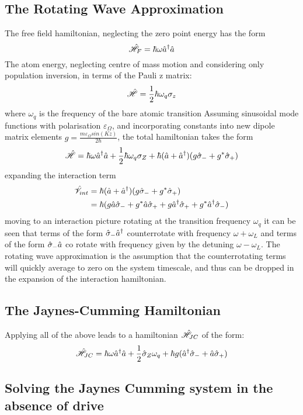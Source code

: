 \subsection{The Rotating Wave Approximation}
The free field hamiltonian, neglecting the zero point energy has the form
\begin{equation}
	\hat{\mathscr{H}}_F =  \hbar \omega {\hat{a}^\dagger} \hat{a}
\end{equation}
The atom energy, neglecting centre of mass motion and considering only population inversion, in terms of the Pauli z matrix:
\begin{equation}
	\hat{\mathscr{H}} = \frac {1} {2} \hbar \omega_q \sigma_z
\end{equation}
where $\omega_q$ is the frequency of the bare atomic transition
Assuming sinusoidal mode functions with polarisation $\varepsilon_\Omega$, and incorporating constants into new dipole matrix elements $g = \frac{m \varepsilon_\Omega sin(Kz)} {2 \hbar}$, the total hamiltonian takes the form
\begin{equation}
	\hat{\mathscr{H}} = \hbar \omega {\hat{a}^\dagger} \hat{a} +\frac{1}{2} \hbar \omega_q \sigma_Z + \hbar (\hat{a} +{\hat{a}^\dagger})(g\hat{\sigma}_-+g^*\hat{\sigma}_+)
\end{equation}
expanding the interaction term
\begin{align}
  \hat{\mathscr{V}}_{int} &= \hbar (\hat{a} +{\hat{a}^\dagger})(g\hat{\sigma}_-+g^*\hat{\sigma}_+) \\
                          &=  \hbar (g \hat{a} \hat{\sigma}_- + g^* \hat{a} \hat{\sigma}_+ + g {\hat{a}^\dagger} \hat{\sigma}_+ +g^* {\hat{a}^\dagger}\hat{\sigma}_-)
\end{align}
moving to an interaction picture rotating at the transition frequency $\omega_q$ it can be seen that terms of the form $\hat{\sigma}_- {\hat{a}^\dagger} $ counterrotate with frequency $\omega + \omega_L$ and terms of the form $ \hat{\sigma}_- \hat{a}$ co rotate with frequency given by the detuning $\omega-\omega_L$.
The rotating wave approximation is the assumption that the counterrotating terms will quickly average to zero on the system timescale, and thus can be dropped in the expansion of the interaction hamiltonian.
\subsection{The Jaynes-Cumming Hamiltonian}
Applying all of the above leads to a hamiltonian $\hat{\mathscr{H}}_{JC}$ of the form:
\begin{equation}
	\hat{\mathscr{H}}_{JC} = \hbar \omega {\hat{a}^\dagger} \hat{a} +\frac{1}{2} \hat{\sigma}_Z \omega_q + \hbar g ({\hat{a}^\dagger} \hat{\sigma}_- + \hat{a} \hat{\sigma}_+)
\end{equation}
\subsection{Solving the Jaynes Cumming system in the absence of drive}
